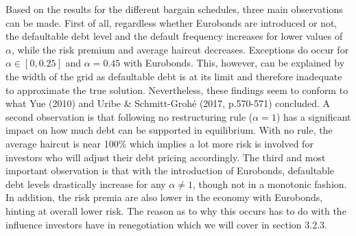 Based on the results for the different bargain schedules, three main observations can be made. First of all, regardless whether Eurobonds are introduced or not, the defaultable debt level and the default frequency increases for lower values of $\alpha$, while the risk premium and average haircut decreases. Exceptions do occur for $\alpha \in [0,0.25]$ and $\alpha = 0.45$ with Eurobonds. This, however, can be explained by the width of the grid as defaultable debt is at its limit and therefore inadequate to approximate the true solution. Nevertheless, these findings seem to conform to what Yue (2010) and Uribe \& Schmitt-Grohé (2017, p.570-571) concluded. A second observation is that following no restructuring rule ($\alpha = 1$) has a significant impact on how much debt can be supported in equilibrium. With no rule, the average haircut is near 100\% which implies a lot more risk is involved for investors who will adjust their debt pricing accordingly. The third and most important observation is that with the introduction of Eurobonds, defaultable debt levels drastically increase for any $\alpha \neq 1$, though not in a monotonic fashion. In addition, the risk premia are also lower in the economy with Eurobonds, hinting at overall lower risk. The reason as to why this occurs has to do with the influence investors have in renegotiation which we will cover in section 3.2.3.\\
